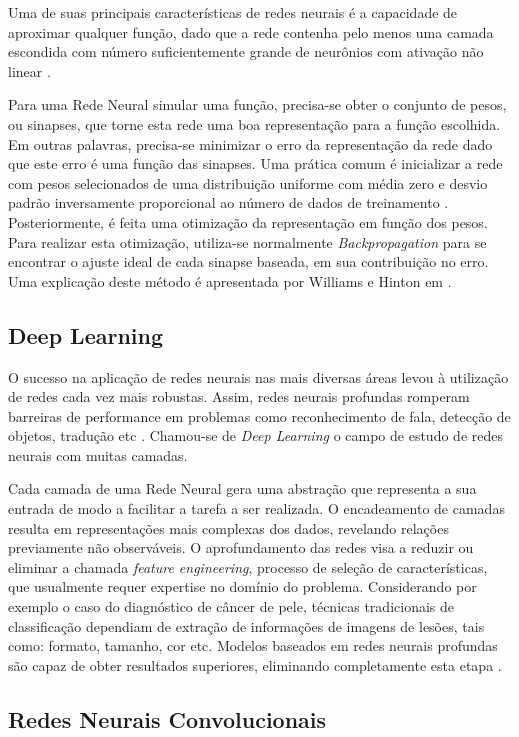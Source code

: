 Uma de suas principais características de redes neurais é a capacidade de aproximar qualquer função, dado que a rede contenha pelo menos uma camada escondida com número suficientemente grande de neurônios com ativação não linear \cite{hornik89}.

Para uma Rede Neural simular uma função, precisa-se obter o conjunto de pesos, ou sinapses, que torne esta rede uma boa representação para a função escolhida. Em outras palavras, precisa-se minimizar o erro da representação da rede dado que este erro é uma função das sinapses. Uma prática comum é inicializar a rede com pesos selecionados de uma distribuição uniforme com média zero e desvio padrão inversamente proporcional ao número de dados de treinamento \cite{lecun12}. Posteriormente, é feita uma otimização da representação em função dos pesos. Para realizar esta otimização, utiliza-se normalmente \textit{Backpropagation} para se encontrar o ajuste ideal de cada sinapse baseada, em sua contribuição no erro. Uma explicação deste método é apresentada por Williams e Hinton em \cite{williams86}.

\subsection{Deep Learning}

O sucesso na aplicação de redes neurais nas mais diversas áreas levou à utilização de redes cada vez mais robustas. Assim, redes neurais profundas romperam barreiras de performance em problemas como reconhecimento de fala, detecção de objetos, tradução etc \cite{lecun15}. Chamou-se de \textit{Deep Learning} o campo de estudo de redes neurais com muitas camadas.

Cada camada de uma Rede Neural gera uma abstração que representa a sua entrada de modo a facilitar a tarefa a ser realizada. O encadeamento de camadas resulta em representações mais complexas dos dados, revelando relações previamente não observáveis. O aprofundamento das redes visa a reduzir ou eliminar a chamada \textit{feature engineering}, processo de seleção de características, que usualmente requer expertise no domínio do problema. Considerando por exemplo o caso do diagnóstico de câncer de pele, técnicas tradicionais de classificação dependiam de extração de informações de imagens de lesões, tais como: formato, tamanho, cor etc. Modelos baseados em redes neurais profundas são capaz de obter resultados superiores, eliminando completamente esta etapa \cite{esteva17}.

\subsection{Redes Neurais Convolucionais} \label{sec:convolucionais}

